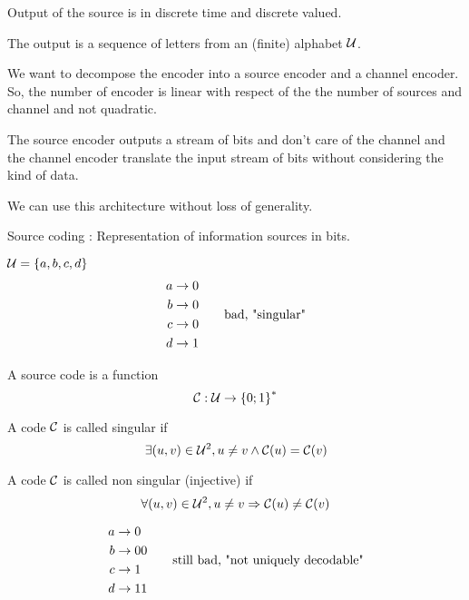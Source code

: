 Output of the source is in discrete time and discrete valued.

\begin{definition}
    The output is a sequence of letters from an (finite) alphabet $\mathcal{U}$.
\end{definition}

We want to decompose the encoder into a source encoder and a channel encoder. So, the number of encoder is linear with respect of the the number of sources and channel and not quadratic.

The source encoder outputs a stream of bits and don't care of the channel and the channel encoder translate the input stream of bits without considering the kind of data.

We can use this architecture without loss of generality.

\bigskip

Source coding : Representation of information sources in bits.

\begin{example}
    $\mathcal{U} = \left\{ a,b,c,d \right\}$
    \[
        \begin{aligned}
            a &\rightarrow 0\\
            b &\rightarrow 0\\
            c &\rightarrow 0\\
            d &\rightarrow 1
        \end{aligned}
        \qquad \text{bad, "singular"}            
    \]
\end{example}

A source code is a function
\[
    \mathcal{C} : \mathcal{U} \rightarrow \left\{ 0;1 \right\}^*
\]

\begin{definition}
    A code $\mathcal{C}$ is called singular  if
    \[
        \exists (u,v) \in \mathcal{U}^2, u \neq v \wedge \mathcal{C}(u) = \mathcal{C}(v)
    \]
\end{definition}

\begin{definition}
    A code $\mathcal{C}$ is called non singular (injective) if
    \[
        \forall (u,v) \in \mathcal{U}^2, u \neq v \Rightarrow \mathcal{C}(u) \neq \mathcal{C}(v)
    \]
\end{definition}

\begin{example}
    \[
        \begin{aligned}
            a &\rightarrow 0\\
            b &\rightarrow 00\\
            c &\rightarrow 1\\
            d &\rightarrow 11
        \end{aligned}
        \qquad \text{still bad, "not uniquely decodable"}            
    \]
\end{example}

